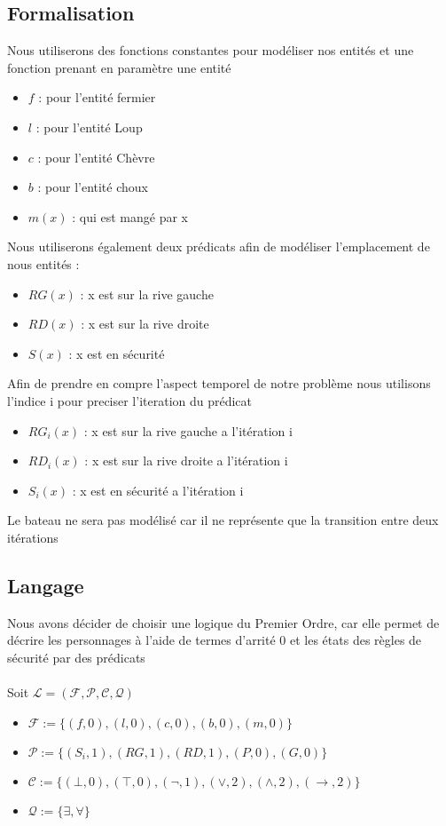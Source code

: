\documentclass{article}
\begin{document}
\subsection{Formalisation}
Nous utiliserons des fonctions constantes pour modéliser nos entités et une fonction prenant en paramètre une entité
\begin{itemize}
  \item $f$ : pour l’entité fermier
  \item $l$ : pour l’entité Loup
  \item $c$ : pour l’entité Chèvre
  \item $b$ : pour l’entité choux
  \item $m(x)$ : qui est mangé par x
\end{itemize}
Nous utiliserons également deux prédicats afin de modéliser l’emplacement de nous entités :
\begin{itemize}
  \item $RG(x)$ : x est sur la rive gauche
  \item $RD(x)$ : x est sur la rive droite
  \item $S(x)$ : x est en sécurité
\end{itemize}
Afin de prendre en compre l'aspect temporel de notre problème nous utilisons l'indice i pour preciser l'iteration du prédicat
\begin{itemize}
  \item $RG_i(x)$ : x est sur la rive gauche a l’itération i
  \item $RD_i(x)$ : x est sur la rive droite a l’itération i
  \item $S_i(x)$ : x est en sécurité a l’itération i
\end{itemize}
Le bateau ne sera pas modélisé car il ne représente que la transition entre deux itérations
\subsection{Langage}
Nous avons décider de choisir une logique du Premier Ordre, car elle permet de décrire les personnages
à l’aide de termes d’arrité 0 et les états des règles de sécurité par des prédicats \\
\\
Soit $\mathcal{L} = (\mathcal{F} ,\mathcal{P} ,\mathcal{C} ,\mathcal{Q} )$
\begin{itemize}
  \item $ \mathcal{F} := \{(f,0),(l,0),(c,0),(b,0),(m,0)\}$
  \item $ \mathcal{P} := \{(S_i,1),(RG,1),(RD,1),(P,0),(G,0)\} $
  \item $ \mathcal{C} := \{(\bot , 0),(\top , 0),(\neg , 1), (\vee , 2), (\wedge , 2), (\rightarrow , 2)\}$
  \item $ \mathcal{Q} := \{\exists, \forall \}$
\end{itemize}
\end{document}
